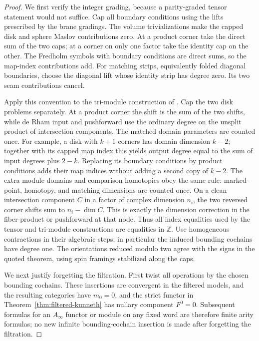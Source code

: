 \documentclass[11pt]{article}
\numberwithin{equation}{section}
\theoremstyle{definition}
\theoremstyle{remark}
\newcommand{\Z}{\mathbb Z}
\begin{document}
\begin{proof}
We first verify the integer grading, because a parity-graded
tensor statement would not suffice.  Cap all boundary conditions
using the lifts prescribed by the brane gradings.  The volume
trivializations make the capped disk and sphere Maslov
contributions zero.  At a product corner take the direct sum
of the two caps; at a corner on only one factor take the
identity cap on the other.  The Fredholm symbols with boundary
conditions are direct sums, so the map-index contributions add.
For matching strips, equivalently folded diagonal boundaries,
choose the diagonal lift whose identity strip has degree zero.
Its two seam contributions cancel.

Apply this convention to the tri-module construction of
\cite[Sections~5 and~16]{Floer:Fukaya}.  Cap the two disk
problems separately.  At a product corner the shift is the sum
of the two shifts, while de Rham input and pushforward use the
ordinary degree on the unsplit product of intersection
components.  The matched domain parameters are counted once.
For example, a disk with $k+1$ corners has domain dimension
$k-2$; together with its capped map index this yields output
degree equal to the sum of input degrees plus $2-k$.
Replacing its boundary conditions by product conditions adds
their map indices without adding a second copy of $k-2$.
The extra module domains and comparison homotopies obey the
same rule: marked-point, homotopy, and matching dimensions
are counted once.  On a clean intersection component $C$
in a factor of complex dimension $n_i$, the two reversed
corner shifts sum to $n_i-\dim C$.  This is exactly the
dimension correction in the fiber-product or pushforward
at that node.  Thus all index equalities used by the tensor
and tri-module constructions are equalities in $\Z$.
Use homogeneous contractions in their algebraic steps;
in particular the induced bounding cochains have degree one.
The orientations reduced modulo two agree with the signs in
the quoted theorem, using spin framings stabilized along the
caps.

We next justify forgetting the filtration.  First twist all
operations by the chosen bounding cochains.  These insertions
are convergent in the filtered models, and the resulting
categories have $m_0=0$, and the strict functor in
Theorem~\ref{thm:filtered-kunneth} has nullary component $F^0=0$.
Subsequent formulas for an
$A_\infty$ functor or module on any fixed word are therefore
finite arity formulas; no new infinite bounding-cochain
insertion is made after forgetting the filtration.


\end{proof}
\end{document}
